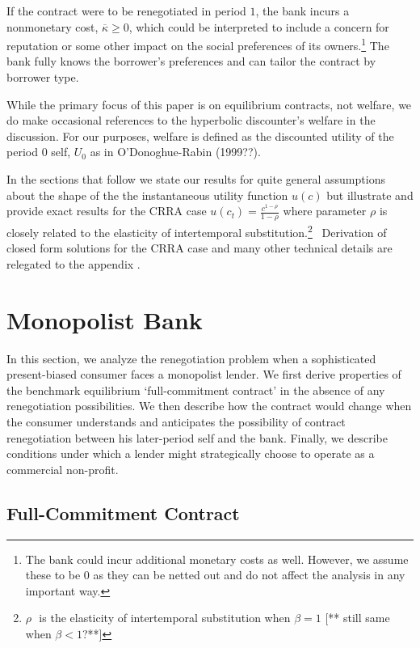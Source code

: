 \documentclass[11pt]{article}%
\begin{document}
If the contract were to be renegotiated in period $1$, the bank incurs a
nonmonetary cost, $\overline{\kappa}\geq0$, which could be interpreted to
include a concern for reputation or some other impact on the social
preferences of its owners.\footnote{The bank could incur additional monetary
costs as well. However, we assume these to be $0$ as they can be netted out
and do not affect the analysis in any important way.} The bank fully knows the
borrower's preferences and can tailor the contract by borrower type.

While the primary focus of this paper is on equilibrium contracts, not
welfare, we do make occasional references to the hyperbolic discounter's
welfare in the discussion. For our purposes, welfare is defined as the
discounted utility of the period $0$ self, $U_{0}$ as in O'Donoghue-Rabin (1999??).

In the sections that follow we state our results for quite general assumptions
about the shape of the the instantaneous utility function $u(c)$ but
illustrate and provide exact results for the CRRA case $u(c_{t})=\frac
{c^{1-\rho}}{1-\rho}$ where parameter $\rho$ is closely related to the
elasticity of intertemporal substitution.\footnote{ \(\)\(\rho \text{ }\)is the elasticity
of intertemporal substitution when $\beta=1$ [** still same when \(\beta<1\)?**]} \ Derivation of
closed form solutions for the CRRA case and many other technical details are
relegated to the appendix .

\section{Monopolist Bank}

In this section, we analyze the renegotiation problem when a sophisticated
present-biased consumer faces a monopolist lender. We first derive properties
of the benchmark equilibrium `full-commitment contract' in the absence of any
renegotiation possibilities. We then describe how the contract would change
when the consumer understands and anticipates the possibility of contract
renegotiation between his later-period self and the bank. Finally, we describe
conditions under which a lender might strategically choose to operate as a
commercial non-profit.

\subsection{Full-Commitment Contract}
\end{document}
